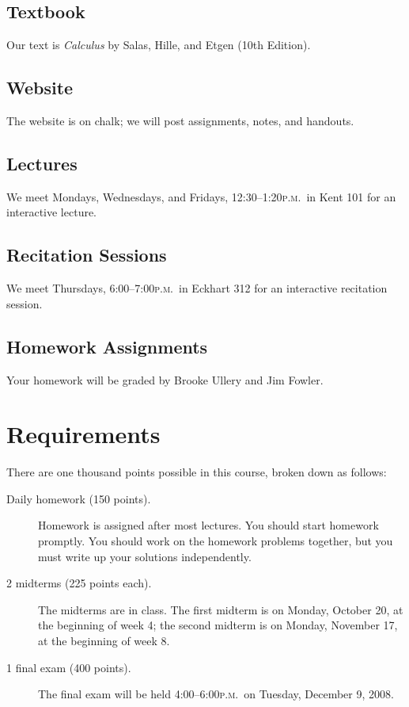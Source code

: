 \documentclass[12pt,letterpaper]{article}
\newcommand{\peem}{\textsc{p.m.}}
\begin{document}
\subsection*{Textbook}
Our text is \textit{Calculus} by Salas, Hille, and Etgen (10th
Edition).

\subsection*{Website}
The website is on chalk; we will post assignments, notes, and handouts.

\subsection*{Lectures}
We meet Mondays, Wednesdays, and Fridays, 12:30--1:20\peem\ in Kent 101 for an interactive lecture.

\subsection*{Recitation Sessions}
We meet Thursdays, 6:00--7:00\peem\ in Eckhart 312 for an interactive
recitation session.

\subsection*{Homework Assignments}
Your homework will be graded by Brooke Ullery and Jim Fowler.

\pagebreak

\section*{Requirements}

There are one thousand points possible in this course, broken down as
follows:
\begin{description}
\item[Daily homework (150 points).]  Homework is assigned after most
  lectures.  You should start homework promptly.  You should work on
  the homework problems together, but you must write up your solutions
  independently.
\item[2 midterms (225 points each).]  The midterms are in class.  The
  first midterm is on Monday, October 20, at the beginning of week 4;
  the second midterm is on Monday, November 17, at the beginning of
  week 8.
\item[1 final exam (400 points).]  The final exam will be held
  4:00--6:00\peem\ on Tuesday, December 9, 2008.
\end{description}
\end{document}
